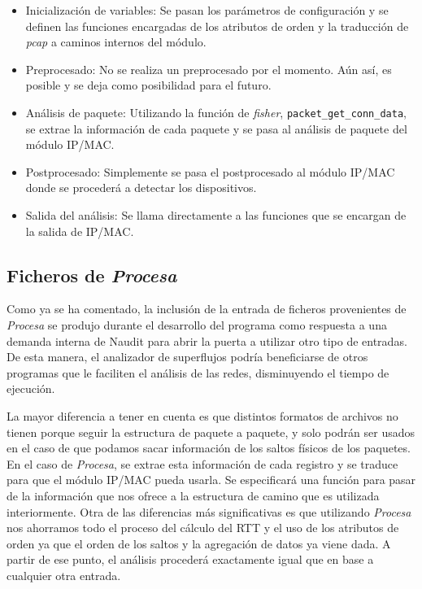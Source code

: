 \documentclass[tfg,epsbased,lof,lot,loa,covers,final,copyright,overleaf]{tfgtfmthesisuam}
\begin{document}
\begin{itemize}
	\item{Inicialización de variables: }Se pasan los parámetros de configuración y se definen las funciones encargadas de los atributos de orden y la traducción de \textit{pcap} a caminos internos del módulo.
	\item{Preprocesado: }No se realiza un preprocesado por el momento. Aún así, es posible y se deja como posibilidad para el futuro.
	\item{Análisis de paquete: }Utilizando la función de \textit{fisher}, \texttt{packet\_get\_conn\_data}, se extrae la información de cada paquete y se pasa al análisis de paquete del módulo IP/MAC.
	\item{Postprocesado: }Simplemente se pasa el postprocesado al módulo IP/MAC donde se procederá a detectar los dispositivos.
	\item{Salida del análisis: }Se llama directamente a las funciones que se encargan de la salida de IP/MAC.
\end{itemize}

\subsection{Ficheros de \textit{Procesa}}
Como ya se ha comentado, la inclusión de la entrada de ficheros provenientes de \textit{Procesa} se produjo durante el desarrollo del programa como respuesta a una demanda interna de Naudit para abrir la puerta a utilizar otro tipo de entradas. De esta manera, el analizador de superflujos podría beneficiarse de otros programas que le faciliten el análisis de las redes, disminuyendo el tiempo de ejecución. 

La mayor diferencia a tener en cuenta es que distintos formatos de archivos no tienen porque seguir la estructura de paquete a paquete, y solo podrán ser usados en el caso de que podamos sacar información de los saltos físicos de los paquetes. En el caso de \textit{Procesa}, se extrae esta información de cada registro y se traduce para que el módulo IP/MAC pueda usarla. Se especificará una función para pasar de la información que nos ofrece a la estructura de camino que es utilizada interiormente. Otra de las diferencias más significativas es que utilizando \textit{Procesa} nos ahorramos todo el proceso del cálculo del RTT y el uso de los atributos de orden ya que el orden de los saltos y la agregación de datos ya viene dada. A partir de ese punto, el análisis procederá exactamente igual que en base a cualquier otra entrada.
\end{document}

